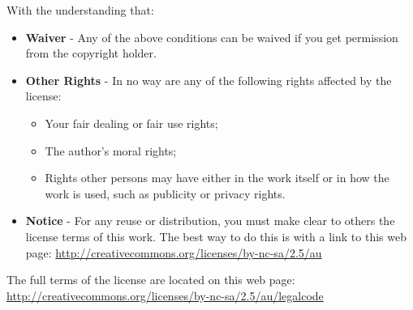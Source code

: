 \begin{flushleft}
With the understanding that:
\begin{itemize}
	\item \textbf{Waiver} - Any of the above conditions can be waived if you get permission from the copyright holder.
	\item \textbf{Other Rights} - In no way are any of the following rights affected by the license:
	\begin{itemize}
		\item Your fair dealing or fair use rights;
		\item The author's moral rights;
		\item Rights other persons may have either in the work itself or in how the work is used, such as publicity or privacy rights.
	\end{itemize}
	\item \textbf{Notice} - For any reuse or distribution, you must make clear to others the license terms of this work. The best way to do this is with a link to this web page: \url{http://creativecommons.org/licenses/by-nc-sa/2.5/au}
\end{itemize}

The full terms of the license are located on this web page: \url{http://creativecommons.org/licenses/by-nc-sa/2.5/au/legalcode}

\end{flushleft}

% 
% 
% 
% 	

